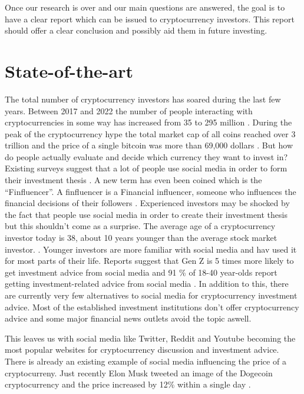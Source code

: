 \noindent Once our research is over and our main questions are answered, the goal is to have a clear report which can be issued to cryptocurrency investors. This report should offer a clear conclusion and possibly aid them in future investing. 



\section{State-of-the-art}%
\label{sec:state-of-the-art}

\noindent The total number of cryptocurrency investors has soared during the last few years. Between 2017 and 2022 the number of people interacting with cryptocurrencies in some way has increased from 35 to 295 million \autocite{Statista2022}. During the peak of the cryptocurrency hype the total market cap of all coins reached over 3 trillion and the price of a single bitcoin was more than 69,000 dollars \autocite{CoinGecko2022}.  But how do people actually evaluate and decide which currency they want to invest in? Existing surveys suggest that a lot of people use social media in order to form their investment thesis \autocite{Graffeo2021}. A new term has even been coined which is the ``Finfluencer''. A finfluencer is a Financial influencer, someone who influences the financial decisions of their followers \autocite{CambridgeWords2021}. Experienced investors may be shocked by the fact that people use social media in order to create their investment thesis but this shouldn't come as a surprise. The average age of a cryptocurrency investor today is 38, about 10 years younger than the average stock market investor. \autocite{Iacurci2021}. Younger investors are more familiar with social media and hav used it for most parts of their life. Reports suggest that Gen Z is 5 times more likely to get investment advice from social media and 91 \% of 18-40 year-olds report getting investment-related advice from social media \autocite{Purnell2022}. In addition to this, there are currently very few alternatives to social media for cryptocurrency investment advice. Most of the established investment institutions don't offer cryptocurrency advice and some major financial news outlets avoid the topic aswell.


\noindent This leaves us with social media like Twitter, Reddit and Youtube becoming the most popular websites for cryptocurrency discussion and investment advice. There is already an existing example of social media influencing the price of a cryptocurreny. Just recently Elon Musk tweeted an image of the Dogecoin cryptocurrency and the price increased by 12\% within a single day \autocite{Saul2022}.


